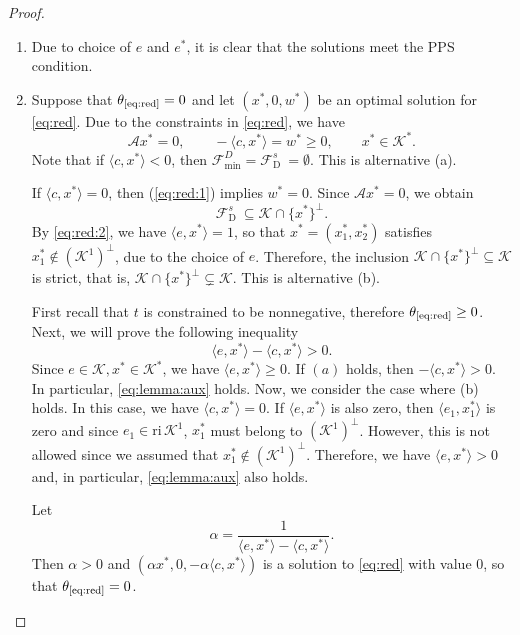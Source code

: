\documentclass{article}
\newcommand{\reInt}{\mathrm{ri}\,}
\newcommand{\inProd}[2]{\langle #1 , #2 \rangle }
\newcommand{\feasS}{\mathcal{F}_{\text{D }}^s}
\newcommand{\minFaceD}{ {\mathcal{F}_{\min}^D}}
\newcommand{\stdMap}{ {\mathcal{A}}}
\newcommand{\stdCone}{ {\mathcal{K}}}
\newcommand{\stdInt}{ {e}}
\newcommand{\opt}[1]{ {\theta _{#1}}}
\begin{document}
\begin{proof}

\begin{enumerate}[label=({\it{\roman*}})]
\item  Due to choice of $\stdInt$ and $\stdInt^*$, it is clear that the solutions 
meet the PPS condition.


\item \fbox{$\opt{\text{\ref{eq:red}}} = 0 \Rightarrow$  (a) or (b) holds.}
Suppose that $\opt{\text{\ref{eq:red}}} = 0$ and let $(x^*,0,w^*)$ be an optimal solution for \eqref{eq:red}.
Due to the constraints in \eqref{eq:red}, we  have
$$\stdMap x^* = 0, \qquad -\inProd{c}{x^*} = w^* \geq 0, \qquad x^* \in \stdCone ^*.$$ 
Note that if $\inProd{c}{x^*} < 0$, then $\minFaceD = \feasS = \emptyset$. This is 
alternative (a).

If $\inProd{c}{x^*} = 0$, then (\eqref{eq:red:1}) implies 
$w^* = 0$. Since $\stdMap x^* = 0$, we obtain  
$$\feasS \subseteq  \stdCone \cap \{x^*\}^\perp. $$
By \eqref{eq:red:2}, we have $\inProd{\stdInt}{x^*} = 1$, so that $x^* = (x_1^*,x_2^*)$ satisfies $x_1^* \not \in (\stdCone^1)^\perp$, due to the choice of $\stdInt$. 
Therefore, the inclusion $\stdCone \cap \{x^*\}^\perp \subseteq \stdCone$ is strict, 
that is,  $\stdCone \cap \{x^*\}^\perp \subsetneq \stdCone$. This is alternative (b).

\fbox{(a) or (b) holds $\Rightarrow \opt{\text{\ref{eq:red}}} = 0$.} 
First recall that  $t$ is constrained to be nonnegative, therefore  $\opt{\text{\ref{eq:red}}} \geq 0$.
Next, we will prove the following inequality
\begin{equation}\label{eq:lemma:aux}
	{\inProd{\stdInt}{x^*} - \inProd{c}{x^*}} > 0.
\end{equation}
Since $\stdInt \in \stdCone,x^* \in \stdCone^*$, we have 
$\inProd{\stdInt}{x^*} \geq 0$. If $(a)$ holds, then $- \inProd{c}{x^*}> 0$.
In particular, \eqref{eq:lemma:aux} holds.
Now, we consider the case where (b) holds. 
In this case, we have $\inProd{c}{x^*} = 0$. 
If $\inProd{\stdInt}{x^*}$ is also zero, then $\inProd{\stdInt_1}{x_1^*}$ is zero and since $\stdInt_1 \in \reInt \stdCone^1$, $ x^*_1$ must 
belong to $(\stdCone^1)^\perp$. However, this is not allowed 
since we assumed that $x_1^* \not \in (\stdCone^1)^\perp$.
Therefore, we have $\inProd{\stdInt}{x^*} > 0$ and, in particular,  \eqref{eq:lemma:aux} also holds.

Let  $$
\alpha = \frac{1}{\inProd{\stdInt}{x^*} - \inProd{c}{x^*}}.
$$
Then $\alpha > 0$ and 
$(\alpha x^*,0,-\alpha \inProd{c}{x^*})$ is a solution to \eqref{eq:red} with value $0$, 
so that $\opt{\text{\ref{eq:red}}} = 0$.


\end{enumerate}
\end{proof}
\end{document}
